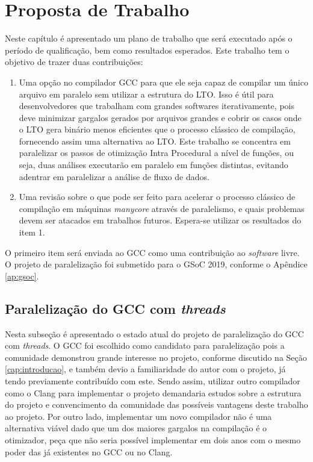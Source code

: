 \chapter{Proposta de Trabalho}
\label{chap:proposta}

Neste capítulo é apresentado um plano de trabalho que será executado
após o período de qualificação, bem como resultados esperados.
Este trabalho tem o objetivo de trazer duas contribuições:
\begin{enumerate}
    \item Uma opção no compilador GCC para que ele seja
capaz de compilar um único arquivo em paralelo sem utilizar a
estrutura do LTO. Isso é útil para desenvolvedores que trabalham
com grandes softwares iterativamente, pois deve minimizar
gargalos gerados por arquivos grandes e cobrir os casos onde o LTO gera
binário menos eficientes que o processo clássico de compilação, fornecendo assim
uma alternativa ao LTO.
Este trabalho se concentra em paralelizar os passos de otimização Intra Procedural
a nível de funções, ou seja, duas análises executarão em paralelo em funções
distintas, evitando adentrar em paralelizar a análise de fluxo de dados.

    \item Uma revisão sobre o que pode ser feito para acelerar o
processo clássico de compilação em máquinas \textit{manycore} através
de paralelismo, e quais problemas devem ser atacados em trabalhos futuros.
Espera-se utilizar os resultados do item 1.
\end{enumerate}
O primeiro item será enviada ao GCC como uma contribuição
ao \textit{software} livre. O projeto de paralelização foi submetido para o GSoC 2019,
conforme o Apêndice \ref{ap:gsoc}.


\section{Paralelização do GCC com \textit{threads}}

Nesta subseção é apresentado o estado atual do projeto de paralelização
do GCC com \textit{threads}. O GCC foi escolhido como candidato para
paralelização pois a comunidade demonstrou grande interesse no projeto,
conforme discutido na Seção \ref{cap:introducao}, e também devio a familiaridade
do autor com o projeto, já tendo previamente contribuído com este. Sendo assim,
utilizar outro compilador como o Clang para implementar o projeto demandaria
estudos sobre a estrutura do projeto e convencimento da comunidade das possíveis
vantagens deste trabalho ao projeto. Por outro lado, implementar um
novo compilador não é uma alternativa viável dado que um dos maiores gargalos
na compilação é o otimizador, peça que não seria possível implementar em
dois anos com o mesmo poder das já existentes no GCC ou no Clang.

